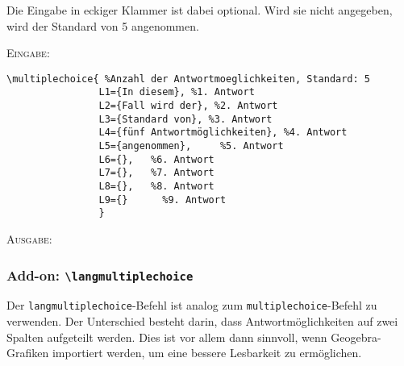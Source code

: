 \documentclass[a4paper,12pt]{article}
\begin{document}
				

Die Eingabe in eckiger Klammer ist dabei optional. Wird sie nicht angegeben, wird der Standard von 5 angenommen. 

\leer




\textsc{Eingabe:}
\begin{verbatim}
\multiplechoice{ %Anzahl der Antwortmoeglichkeiten, Standard: 5
				L1={In diesem}, %1. Antwort 
				L2={Fall wird der}, %2. Antwort
				L3={Standard von}, %3. Antwort
				L4={fünf Antwortmöglichkeiten}, %4. Antwort
				L5={angenommen},	 %5. Antwort
				L6={},	 %6. Antwort
				L7={},	 %7. Antwort
				L8={},	 %8. Antwort
				L9={}	   %9. Antwort
				}
\end{verbatim}

\textsc{Ausgabe:}




\subsubsection{Add-on: \texttt{\textbackslash langmultiplechoice}}

Der \texttt{langmultiplechoice}-Befehl ist analog zum \texttt{multiplechoice}-Befehl zu verwenden. Der Unterschied besteht darin, dass Antwortmöglichkeiten auf zwei Spalten aufgeteilt werden. Dies ist vor allem dann sinnvoll, wenn Geogebra-Grafiken importiert werden, um eine bessere Lesbarkeit zu ermöglichen.
\end{document}
